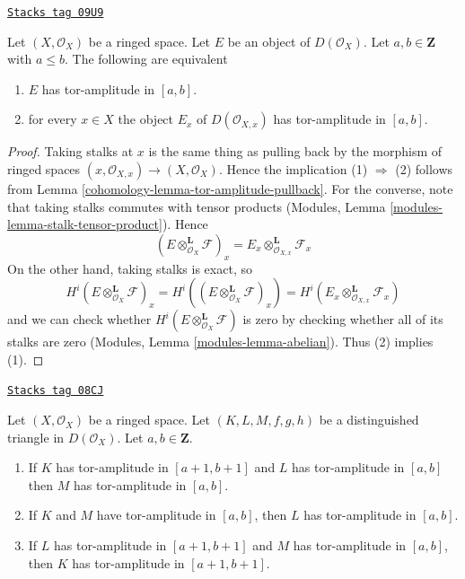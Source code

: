 \begin{lemma}
\label{cohomology-lemma-tor-amplitude-stalk}
\href{https://stacks.math.columbia.edu/tag/09U9}{\texttt{Stacks tag 09U9}}

Let $(X, \mathcal{O}_X)$ be a ringed space.
Let $E$ be an object of $D(\mathcal{O}_X)$.
Let $a, b \in \mathbf{Z}$ with $a \leq b$. The following are equivalent
\begin{enumerate}
\item $E$ has tor-amplitude in $[a, b]$.
\item for every $x \in X$ the object $E_x$ of $D(\mathcal{O}_{X, x})$
has tor-amplitude in $[a, b]$.
\end{enumerate}
\end{lemma}

\begin{proof}

Taking stalks at $x$ is the same thing as pulling back by the
morphism of ringed spaces $(x, \mathcal{O}_{X, x}) \to (X, \mathcal{O}_X)$.
Hence the implication (1) $\Rightarrow$ (2) follows from
Lemma \ref{cohomology-lemma-tor-amplitude-pullback}.
For the converse, note that taking stalks commutes with tensor
products (Modules, Lemma \ref{modules-lemma-stalk-tensor-product}).
Hence
$$
(E \otimes_{\mathcal{O}_X}^\mathbf{L} \mathcal{F})_x =
E_x \otimes_{\mathcal{O}_{X, x}}^\mathbf{L} \mathcal{F}_x
$$
On the other hand, taking stalks is exact, so
$$
H^i(E \otimes_{\mathcal{O}_X}^\mathbf{L} \mathcal{F})_x =
H^i((E \otimes_{\mathcal{O}_X}^\mathbf{L} \mathcal{F})_x) =
H^i(E_x \otimes_{\mathcal{O}_{X, x}}^\mathbf{L} \mathcal{F}_x)
$$
and we can check whether
$H^i(E \otimes_{\mathcal{O}_X}^\mathbf{L} \mathcal{F})$ is zero
by checking whether all of its stalks are zero
(Modules, Lemma \ref{modules-lemma-abelian}). Thus (2) implies (1).
\end{proof}

\begin{lemma}
\label{cohomology-lemma-cone-tor-amplitude}
\href{https://stacks.math.columbia.edu/tag/08CJ}{\texttt{Stacks tag 08CJ}}

Let $(X, \mathcal{O}_X)$ be a ringed space.
Let $(K, L, M, f, g, h)$ be a distinguished
triangle in $D(\mathcal{O}_X)$. Let $a, b \in \mathbf{Z}$.
\begin{enumerate}
\item If $K$ has tor-amplitude in $[a + 1, b + 1]$ and
$L$ has tor-amplitude in $[a, b]$ then $M$ has
tor-amplitude in $[a, b]$.
\item If $K$ and $M$ have tor-amplitude in $[a, b]$, then
$L$ has tor-amplitude in $[a, b]$.
\item If $L$ has tor-amplitude in $[a + 1, b + 1]$
and $M$ has tor-amplitude in $[a, b]$, then
$K$ has tor-amplitude in $[a + 1, b + 1]$.
\end{enumerate}
\end{lemma}

